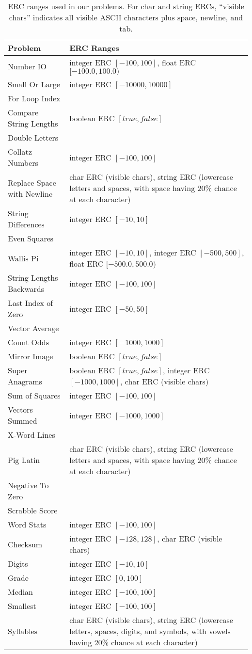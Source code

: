 \documentclass{sig-alternate}
\begin{document}
\begin{table*}[t]
\centering
\caption{ERC ranges used in our problems. For char and string ERCs, ``visible chars'' indicates all visible ASCII characters plus space, newline, and tab.}
\label{tableERCranges}
\begin{tabular}{l>{\raggedright}p{10.6cm}}
\toprule
\textbf{Problem}                    & \textbf{ERC Ranges} \tabularnewline
\midrule
Number IO                  & integer ERC $[-100, 100]$, float ERC $[-100.0, 100.0)$ \tabularnewline
Small Or Large             & integer ERC $[-10000,10000]$        \tabularnewline
For Loop Index             &                         \tabularnewline
Compare String Lengths     & boolean ERC $[true, false]$ \tabularnewline
Double Letters             & \tabularnewline
Collatz Numbers            & integer ERC $[-100, 100]$  \tabularnewline
Replace Space with Newline & char ERC (visible chars), string ERC (lowercase letters and spaces, with space having 20\% chance at each character)   \tabularnewline
String Differences         & integer ERC $[-10, 10]$                       \tabularnewline
Even Squares               & \tabularnewline
Wallis Pi                  & integer ERC $[-10, 10]$, integer ERC $[-500, 500]$, float ERC $[-500.0, 500.0)$ \tabularnewline
String Lengths Backwards   & integer ERC $[-100, 100]$               \tabularnewline
Last Index of Zero         & integer ERC $[-50, 50]$     \tabularnewline
Vector Average             &     \tabularnewline
Count Odds                 & integer ERC $[-1000, 1000]$       \tabularnewline
Mirror Image               & boolean ERC $[true, false]$          \tabularnewline
Super Anagrams             & boolean ERC $[true, false]$, integer ERC $[-1000, 1000]$, char ERC (visible chars) \tabularnewline
Sum of Squares             & integer ERC $[-100, 100]$       \tabularnewline
Vectors Summed             & integer ERC $[-1000, 1000]$            \tabularnewline
X-Word Lines               &             \tabularnewline
Pig Latin                  & char ERC (visible chars), string ERC (lowercase letters and spaces, with space having 20\% chance at each character)  \tabularnewline
Negative To Zero           &             \tabularnewline
Scrabble Score             & \tabularnewline
Word Stats                 & integer ERC $[-100, 100]$           \tabularnewline
Checksum                   & integer ERC $[-128, 128]$, char ERC (visible chars)      \tabularnewline
Digits                     & integer ERC $[-10, 10]$          \tabularnewline
Grade                      & integer ERC $[0, 100]$         \tabularnewline
Median                     & integer ERC $[-100, 100]$            \tabularnewline
Smallest                   & integer ERC $[-100, 100]$           \tabularnewline
Syllables                  & char ERC (visible chars), string ERC (lowercase letters, spaces, digits, and symbols, with vowels having 20\% chance at each character) \tabularnewline
\bottomrule
\end{tabular}
\end{table*}
\end{document}
